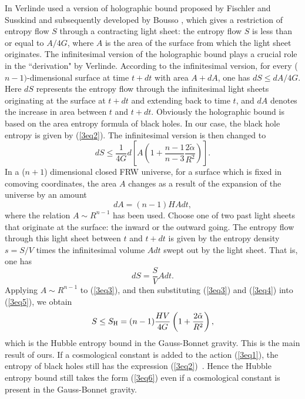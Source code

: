 \documentclass[a4paper,12pt]{article}
\begin{document}
In \cite{Verl} Verlinde used a version of holographic bound proposed by Fischler and
Susskind \cite{FS} and subsequently developed by Bousso \cite{Bous}, which gives a
restriction of entropy flow
$S$ through a contracting light sheet: the entropy flow $S$ is less than or equal to $A/4G$,
where $A$ is the area of the surface from which the light sheet originates.  The
infinitesimal version of the holographic bound plays a crucial role in the ``derivation"
by Verlinde.  According to the infinitesimal version, for every ($n-1)$-dimensional
surface at time $t +dt$ with area $A+dA$, one has $dS \le dA/4G$. Here $dS$ represents
the entropy flow through the infinitesimal light sheets originating  at the surface
at $t +dt$ and extending back to time $t$, and $dA$ denotes the increase in area
between $t$ and $t +dt$. Obviously the
holographic bound is based on the area entropy formula of black holes. In our case,
the black hole entropy is given by (\ref{3eq2}). The infinitesimal version  is then
 changed to
\begin{equation}
\label{3eq3}
dS \le \frac{1}{4G}d\left[ A \left( 1 +\frac{n-1}{n-3}\frac{2\tilde \alpha }{R^2}\right)
  \right].
\end{equation}
In a ($n+1$) dimensional closed FRW universe, for a surface which is fixed in comoving
coordinates,  the area $A$ changes as a result of the expansion of the universe by
 an amount
\begin{equation}
\label{3eq4}
dA =(n-1)HA dt,
\end{equation}
where the relation $A \sim R^{n-1}$ has been used.  Choose one of two past light sheets
that originate at the surface: the inward or the outward going. The entropy flow through
this light sheet between $t$ and $t +dt$ is given by the entropy density $s=S/V$ times the
infinitesimal volume $A dt$ swept out by the light sheet. That is, one has
\begin{equation}
\label{3eq5}
dS =\frac{S}{V} A dt.
\end{equation}
Applying $A \sim R^{n-1}$ to (\ref{3eq3}), and then substituting (\ref{3eq3}) and
(\ref{3eq4}) into (\ref{3eq5}), we obtain
\begin{equation}
\label{3eq6}
S \le S_{\rm H} =(n-1) \frac{HV}{4G}\left (1+\frac{2\tilde \alpha}{R^2}\right),
\end{equation}
which is the Hubble entropy bound in the Gauss-Bonnet gravity. This is the main result
of ours.  If a cosmological
constant is added to the action (\ref{3eq1}), the entropy of black holes still has
the expression (\ref{3eq2})~\cite{Cai}.
Hence the Hubble entropy bound still takes the form (\ref{3eq6}) even if
 a cosmological constant is present in the Gauss-Bonnet gravity.
\end{document}
